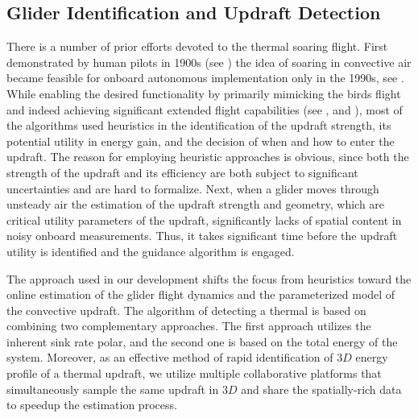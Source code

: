 \documentclass{ifacconf}
\newcommand{\squeezeup}{\vspace{-2.0mm}}
\begin{document}
\subsection{Glider Identification and Updraft Detection}
\label{subsec:SysID}
\squeezeup

There is a number of prior efforts devoted to the thermal soaring flight. First
demonstrated by human pilots in 1900s (see \cite{Simons:1998}) the idea of soaring in
convective air became feasible for onboard autonomous implementation only in the 1990s,
see \cite{Wharington:1998}. While enabling the desired functionality by primarily
mimicking the birds flight and indeed achieving significant extended flight capabilities
(see \cite{Edwards:2008}, \cite{Allen:2006} and \cite{Allen:2007}), most of the
algorithms used heuristics in the identification of the updraft strength, its potential
utility in energy gain, and the decision of when and how to enter the updraft. The reason
for employing heuristic approaches is obvious, since both the strength of the updraft and
its efficiency are both subject to significant uncertainties and are hard to formalize.
Next, when a glider moves through unsteady air the estimation of the updraft strength and
geometry, which are critical utility parameters of the updraft, significantly lacks of
spatial content in noisy onboard measurements. Thus, it takes significant time before the
updraft utility is identified and the guidance algorithm is engaged.
%

The approach used in our development shifts the focus from heuristics toward the online
estimation of the glider flight dynamics and the parameterized model of the convective
updraft. The algorithm of detecting a thermal is based on combining two complementary
approaches. The first approach utilizes the inherent sink rate polar, and the second one
is based on the total energy of the system. Moreover, as an effective method of rapid
identification of $3D$ energy profile of a thermal updraft, we utilize multiple
collaborative platforms that simultaneously sample the same updraft in $3D$ and share the
spatially-rich data to speedup the estimation process.
\end{document}
